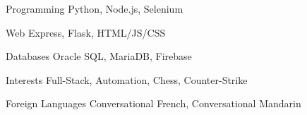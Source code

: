 

\begin{cvskills}

  \cvskill
  {Programming} %
  {Python, Node.js, Selenium} %

  \cvskill
  {Web} %
  {Express, Flask, HTML/JS/CSS} %

  \cvskill
  {Databases} %
  {Oracle SQL, MariaDB, Firebase} %


  \cvskill
  {Interests} %
  {Full-Stack, Automation, Chess, Counter-Strike} %

  \cvskill
  {Foreign Languages} %
  {Conversational French, Conversational Mandarin} %

\end{cvskills}
